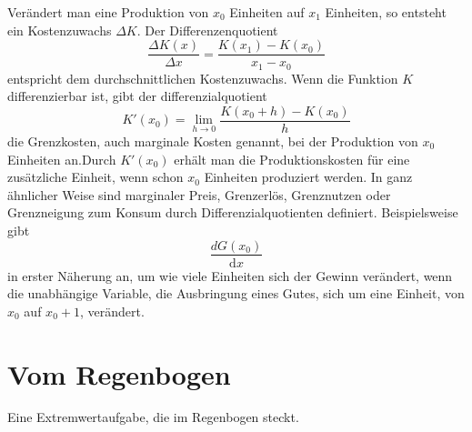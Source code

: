\documentclass[%
<<<<<<< Updated upstream
11pt,%
twoside,%
titlepage,%
german,%
=======
11pt,%
twoside,%
titlepage,%
swissgerman,%
>>>>>>> Stashed changes
headsepline%
]{scrartcl}
\theoremstyle{definition}
\theoremstyle{plain}
\begin{document}
Verändert man eine Produktion von $x_0$ Einheiten auf $x_1$ Einheiten, so entsteht ein Kostenzuwachs $\Delta K$. Der Differenzenquotient
$$\frac{\Delta K(x)}{\Delta x}=\frac{K(x_1)-K(x_0)}{x_1-x_0}$$
entspricht dem durchschnittlichen Kostenzuwachs.
Wenn die Funktion $K$ differenzierbar ist, gibt der differenzialquotient
$$K'(x_0)=\lim_{h\to0}\frac{K(x_0+h)-K(x_0)}{h}$$
die Grenzkosten, auch marginale Kosten genannt, bei der Produktion von $x_0$ Einheiten an.Durch $K'(x_0)$ erhält man die Produktionskosten für eine zusätzliche Einheit, wenn schon $x_0$ Einheiten produziert werden.
In ganz ähnlicher Weise sind marginaler Preis, Grenzerlös, Grenznutzen oder Grenzneigung zum Konsum durch Differenzialquotienten definiert. Beispielsweise gibt
$$\frac{dG(x_0)}{\mathrm{d}x}$$
in erster Näherung an, um wie viele Einheiten sich der Gewinn verändert, wenn die unabhängige Variable, die Ausbringung eines Gutes, sich um eine Einheit, von $x_0$ auf $x_0 + 1$, verändert.

\clearpage

\section{Vom Regenbogen}
Eine Extremwertaufgabe, die im Regenbogen steckt.


\cleardoublepage
\listoffigures
\listoftables
\end{document}
